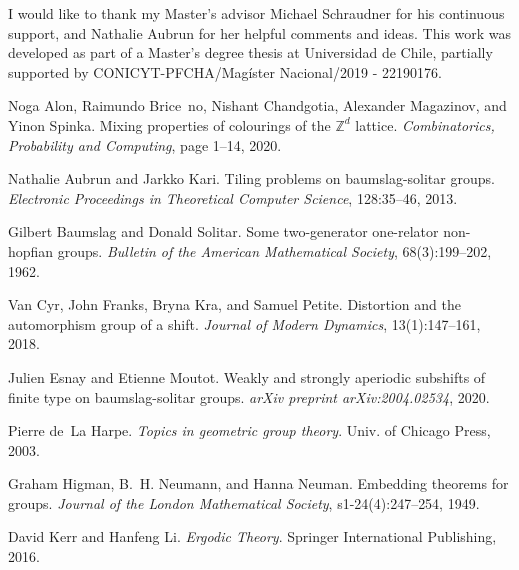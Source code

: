 \documentclass[cupthm,crop,info]{CUP-JNL-ETS}%
\theoremstyle{cupplain}
\theoremstyle{cupdefinition}
\theoremstyle{cupremark}
\theoremstyle{cupproof}
\numberwithin{equation}{section}
\begin{document}
\begin{Backmatter}

\begin{ack}
I would like to thank my Master's advisor Michael Schraudner for his continuous support, and Nathalie Aubrun for her helpful comments and ideas. This work was developed as part of a Master's degree thesis at Universidad de Chile, partially supported by CONICYT-PFCHA/Mag\'ister Nacional/2019 - 22190176.
\end{ack}

\newcommand{\etalchar}[1]{$^{#1}$}

\begin{thebibliography}{10}

	
Noga Alon, Raimundo Brice{~n}o, Nishant Chandgotia, Alexander Magazinov, and
Yinon Spinka. Mixing properties of colourings of the {$\mathbb{Z}^{d}$} lattice. {\em Combinatorics, Probability and Computing}, page 1–14, 2020.

	Nathalie Aubrun and Jarkko Kari.
Tiling problems on baumslag-solitar groups. {\em Electronic Proceedings in Theoretical Computer Science}, 128:35–46, 2013.

	

	Gilbert Baumslag and Donald Solitar.
Some two-generator one-relator non-hopfian groups.
 {\em Bulletin of the American Mathematical Society}, 68(3):199–202, 1962.

	
Van Cyr, John Franks, Bryna Kra, and Samuel Petite. Distortion and the automorphism group of a shift. {\em Journal of Modern Dynamics}, 13(1):147–161, 2018.

	Julien Esnay and Etienne Moutot.
Weakly and strongly aperiodic subshifts of finite type on baumslag-solitar groups. {\em arXiv preprint  arXiv:2004.02534}, 2020.

Pierre de~La Harpe. {\em Topics in geometric group theory}. Univ. of Chicago Press, 2003.

	

	Graham Higman, B.~H. Neumann, and Hanna Neuman. Embedding theorems for groups.
{\em Journal of the London Mathematical Society}, s1-24(4):247--254, 1949.


	David Kerr and Hanfeng Li. {\em Ergodic Theory}. Springer International Publishing, 2016.

	


\end{thebibliography}
\end{Backmatter}
\end{document}
